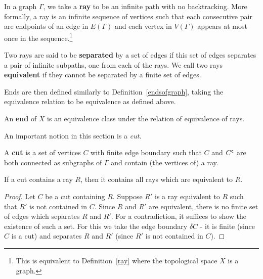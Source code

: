 In a graph \(\Gamma\), we take a \textbf{ray} to be an infinite path with no backtracking. More formally, a ray is an infinite sequence of vertices such that each consecutive pair are endpoints of an edge in \(E(\Gamma)\) and each vertex in \(V(\Gamma)\) appears at most once in the sequence.\footnote{This is equivalent to Definition~\ref{ray} where the topological space \(X\) is a graph.}

\begin{definition}
Two rays are said to be \textbf{separated} by a set of edges if this set of edges separates a pair of infinite subpaths, one from each of the rays. We call two rays \textbf{equivalent} if they cannot be separated by a finite set of edges.
\end{definition}

Ends are then defined similarly to Definition~\ref{endsofgraph}, taking the equivalence relation to be equivalence as defined above. %

\begin{definition}
    An \textbf{end} of \(X\) is an equivalence class under the relation of equivalence of rays.  
\end{definition}

An important notion in this section is a \emph{cut}.
\begin{definition}[Cut]
 A \textbf{cut} is a set of vertices \(C\) with finite edge boundary such that \(C\) and \({C}^{\mathsf{c}}\) are both connected as subgraphs of \(\Gamma\) and contain (the vertices of) a ray.
\end{definition}

\begin{proposition}
    \label{prop:ray}
     If a cut contains a ray \(R\), then it contains all rays which are equivalent to \(R\).
\end{proposition}

\begin{proof}
    Let \(C\) be a cut containing \(R\). Suppose \(R'\) is a ray equivalent to \(R\) such that \(R'\) is not contained in \(C\).
    Since \(R\) and \(R'\) are equivalent, there is no finite set of edges which separates \(R\) and \(R'\). For a contradiction, it suffices to show the existence of such a set. For this we take the edge boundary \(\delta C\) - it is finite (since \(C\) is a cut) and separates \(R\) and \(R'\) (since \(R'\) is not contained in \(C\)). 
\end{proof}

